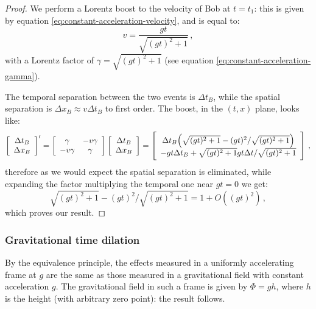 \documentclass[main.tex]{subfiles}
\begin{document}
\begin{proof}
We perform a Lorentz boost to the velocity of Bob at \(t=t_1 \): this is given by equation \eqref{eq:constant-acceleration-velocity}, and is equal to:
%
\begin{equation}
  v = \frac{gt }{\sqrt{(gt)^2 + 1}}
\,,
\end{equation}
%
with a Lorentz factor of \(\gamma = \sqrt{(gt)^2 +1} \) (see equation \eqref{eq:constant-acceleration-gamma}).

The temporal separation between the two events is \(\Delta t_B\), while the spatial separation is \(\Delta x_B \approx  v \Delta t_B\) to first order. The boost, in the \((t, x)\) plane, looks like: 
%
\begin{equation}
  \left[\begin{array}{c}
  \Delta t_B \\ 
  \Delta x_B
  \end{array}\right]'
  =
  \left[\begin{array}{cc}
  \gamma  & -v \gamma  \\ 
  -v \gamma  & \gamma 
  \end{array}\right]  
  \left[\begin{array}{c}
  \Delta t_B \\ 
  \Delta x_B
  \end{array}\right] 
  =
  \left[\begin{array}{c}
  \Delta t_B \qty(\sqrt{(gt)^2+1} - (gt)^2/\sqrt{(gt)^2+1}) \\ 
  -gt \Delta t_B + \sqrt{(gt)^2+1} gt \Delta t / \sqrt{(gt)^2+1}
  \end{array}\right]
\,,
\end{equation}
%
therefore as we would expect the spatial separation is eliminated, while expanding the factor multiplying the temporal one near \(gt = 0\) we get: 
%
\begin{equation}
  \sqrt{(gt)^2+1} - (gt)^2/\sqrt{(gt)^2+1} = 1+O((gt)^2)
\,,
\end{equation}
%
which proves our result.
\end{proof}

\subsubsection{Gravitational time dilation}

By the equivalence principle, the effects measured in a uniformly accelerating frame at \(g\) are the same as those measured in a gravitational field with constant acceleration \(g\).
The gravitational field in such a frame is given by \(\Phi  = gh\), where \(h\) is the height (with arbitrary zero point): the result follows.
\end{document}
